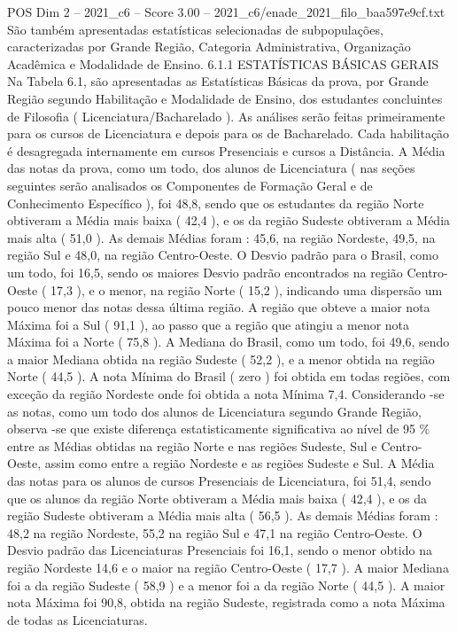 \begin{textsample}{POS Dim 2 – 2021\_c6 – Score 3.00 – 2021\_c6/enade\_2021\_filo\_baa597e9cf.txt}
São também apresentadas estatísticas selecionadas de subpopulações, caracterizadas por Grande Região, Categoria Administrativa, Organização Acadêmica e Modalidade de Ensino. 6.1.1 ESTATÍSTICAS BÁSICAS GERAIS Na Tabela 6.1, são apresentadas as Estatísticas Básicas da prova, por Grande Região segundo Habilitação e Modalidade de Ensino, dos estudantes concluintes de Filosofia ( Licenciatura/Bacharelado ).
As análises serão feitas primeiramente para os cursos de Licenciatura e depois para os de Bacharelado.
Cada habilitação é desagregada internamente em cursos Presenciais e cursos a Distância.
A Média das notas da prova, como um todo, dos alunos de Licenciatura ( nas seções seguintes serão analisados os Componentes de Formação Geral e de Conhecimento Específico ), foi 48,8, sendo que os estudantes da região Norte obtiveram a Média mais baixa ( 42,4 ), e os da região Sudeste obtiveram a Média mais alta ( 51,0 ).
As demais Médias foram : 45,6, na região Nordeste, 49,5, na região Sul e 48,0, na região Centro-Oeste.
O Desvio padrão para o Brasil, como um todo, foi 16,5, sendo os maiores Desvio padrão encontrados na região Centro-Oeste ( 17,3 ), e o menor, na região Norte ( 15,2 ), indicando uma dispersão um pouco menor das notas dessa última região.
A região que obteve a maior nota Máxima foi a Sul ( 91,1 ), ao passo que a região que atingiu a menor nota Máxima foi a Norte ( 75,8 ).
A Mediana do Brasil, como um todo, foi 49,6, sendo a maior Mediana obtida na região Sudeste ( 52,2 ), e a menor obtida na região Norte ( 44,5 ).
A nota Mínima do Brasil ( zero ) foi obtida em todas regiões, com exceção da região Nordeste onde foi obtida a nota Mínima 7,4.
Considerando -se as notas, como um todo dos alunos de Licenciatura segundo Grande Região, observa -se que existe diferença estatisticamente significativa ao nível de 95 \% entre as Médias obtidas na região Norte e nas regiões Sudeste, Sul e Centro-Oeste, assim como entre a região Nordeste e as regiões Sudeste e Sul.
A Média das notas para os alunos de cursos Presenciais de Licenciatura, foi 51,4, sendo que os alunos da região Norte obtiveram a Média mais baixa ( 42,4 ), e os da região Sudeste obtiveram a Média mais alta ( 56,5 ).
As demais Médias foram : 48,2 na região Nordeste, 55,2 na região Sul e 47,1 na região Centro-Oeste.
O Desvio padrão das Licenciaturas Presenciais foi 16,1, sendo o menor obtido na região Nordeste 14,6 e o maior na região Centro-Oeste ( 17,7 ).
A maior Mediana foi a da região Sudeste ( 58,9 ) e a menor foi a da região Norte ( 44,5 ).
A maior nota Máxima foi 90,8, obtida na região Sudeste, registrada como a nota Máxima de todas as Licenciaturas.

\end{textsample}

